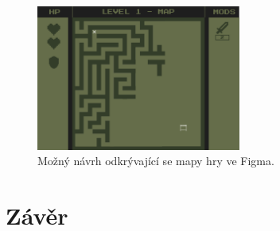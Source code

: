 \begin{figure}[H]
    \centering
    \includegraphics[width=0.6\textwidth, height=0.26\textheight]{obrazky-figures/ch5/Game_screen-MAP.png}
    \caption{Možný návrh odkrývající se mapy hry ve Figma.}
    \label{fig:map_idea}
\end{figure}

\chapter{Závěr}

%

